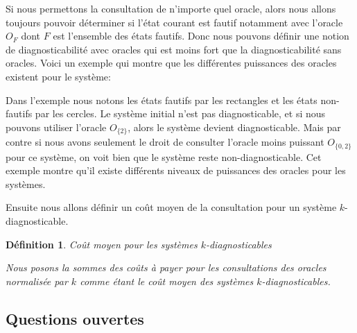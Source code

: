 \documentclass[a4paper,10pt]{article}
\newtheorem{mydef}{D\'efinition}
\begin{document}
Si nous permettons la consultation de n'importe quel oracle, alors nous allons toujours pouvoir d\'eterminer si l'\'etat courant est fautif notamment avec l'oracle $O_F$ dont $F$ est l'ensemble des \'etats fautifs. Donc nous pouvons d\'efinir une notion de diagnosticabilit\'e avec oracles qui est moins fort que la diagnosticabilit\'e sans oracles. Voici un exemple qui montre que les diff\'erentes puissances des oracles existent pour le syst\`eme:

\begin{figure}[H]
  \begin{center}
  \end{center}
\end{figure}

Dans l'exemple nous notons les \'etats fautifs par les rectangles et les \'etats non-fautifs par les cercles. Le syst\`eme initial n'est pas diagnosticable, et si nous pouvons utiliser l'oracle $O_{\{2\}}$, alors le système devient diagnosticable. Mais par contre si nous avons seulement le droit de consulter l'oracle moins puissant $O_{\{0,2\}}$ pour ce système, on voit bien que le système reste non-diagnosticable. Cet exemple montre qu'il existe différents niveaux de puissances des oracles pour les systèmes.

Ensuite nous allons d\'efinir un co\^ut moyen de la consultation pour un syst\`eme $k$-diagnosticable.

\begin{mydef}{Co\^ut moyen pour les syst\`emes $k$-diagnosticables}
  
  Nous posons la sommes des co\^uts \`a payer pour les consultations des oracles normalis\'ee par $k$ comme \'etant le co\^ut moyen des syst\`emes $k$-diagnosticables.
\end{mydef}

\subsection{Questions ouvertes}
\end{document}
